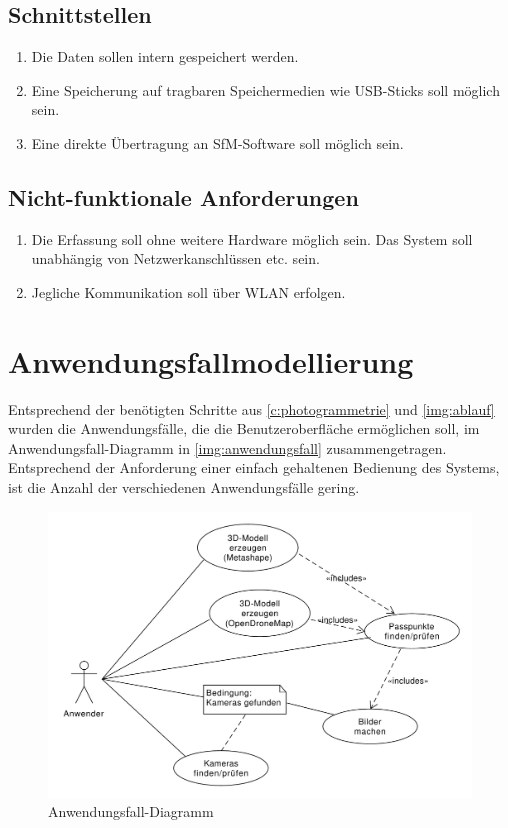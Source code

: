 \documentclass[./00PhotoBox.tex]{subfiles}
\begin{document}
\subsection{Schnittstellen}
\begin{enumerate}[label=S\arabic*]
  \item \label{e:intspeicher} Die Daten sollen intern gespeichert werden.
  \item \label{e:usbspeicher} Eine Speicherung auf tragbaren Speichermedien wie USB-Sticks soll möglich sein.
  \item \label{e:sfmsoftware} Eine direkte Übertragung an SfM-Software soll möglich sein.
\end{enumerate}

\subsection{Nicht-funktionale Anforderungen}
\begin{enumerate}[label=N\arabic*]
  \item \label{e:standalone} Die Erfassung soll ohne weitere Hardware möglich sein. Das System soll unabhängig von Netzwerkanschlüssen etc. sein.
  \item \label{e:wlan} Jegliche Kommunikation soll über WLAN erfolgen.
\end{enumerate}

\section{Anwendungsfallmodellierung}
\label{sec:Anwendungsfallmodellierung}

Entsprechend der benötigten Schritte aus \autoref{c:photogrammetrie} und \autoref{img:ablauf} wurden die Anwendungsfälle, die die Benutzeroberfläche ermöglichen soll, im Anwendungsfall-Dia\-gramm in \autoref{img:anwendungsfall} zusammengetragen. Entsprechend der Anforderung einer einfach gehaltenen Bedienung des Systems, ist die Anzahl der verschiedenen Anwendungsfälle gering.

\begin{figure}
  \centering
  \includegraphics[width=1\textwidth]{./img/uml/uml_usecases.pdf}
  \caption{Anwendungsfall-Diagramm} %
  \label{img:anwendungsfall} %
\end{figure}
\end{document}
